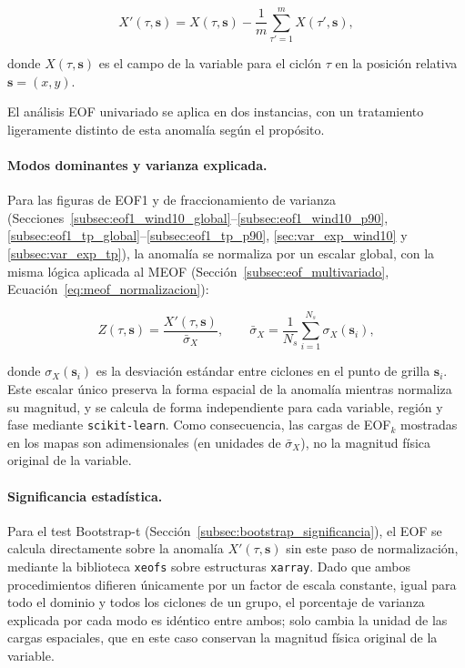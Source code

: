 \begin{equation}\label{eq:eof_anomalia}
    X'(\tau, \mathbf{s}) = X(\tau, \mathbf{s}) - \frac{1}{m}\sum_{\tau'=1}^{m}X(\tau', \mathbf{s}),
\end{equation}

donde $X(\tau, \mathbf{s})$ es el campo de la variable para el ciclón $\tau$ en la posición relativa $\mathbf{s} = (x,y)$.

El análisis EOF univariado se aplica en dos instancias, con un tratamiento ligeramente distinto de esta anomalía según el propósito.

\paragraph{Modos dominantes y varianza explicada.} Para las figuras de EOF1 y de fraccionamiento de varianza (Secciones~\ref{subsec:eof1_wind10_global}--\ref{subsec:eof1_wind10_p90}, \ref{subsec:eof1_tp_global}--\ref{subsec:eof1_tp_p90}, \ref{sec:var_exp_wind10} y \ref{subsec:var_exp_tp}), la anomalía se normaliza por un escalar global, con la misma lógica aplicada al MEOF (Sección~\ref{subsec:eof_multivariado}, Ecuación~\ref{eq:meof_normalizacion}):

\begin{equation}\label{eq:eof_normalizacion}
    Z(\tau, \mathbf{s}) = \frac{X'(\tau, \mathbf{s})}{\bar{\sigma}_X}, \qquad \bar{\sigma}_X = \frac{1}{N_s}\sum_{i=1}^{N_s} \sigma_X(\mathbf{s}_i),
\end{equation}

donde $\sigma_X(\mathbf{s}_i)$ es la desviación estándar entre ciclones en el punto de grilla $\mathbf{s}_i$. Este escalar único preserva la forma espacial de la anomalía mientras normaliza su magnitud, y se calcula de forma independiente para cada variable, región y fase mediante \texttt{scikit-learn}. Como consecuencia, las cargas de EOF$_k$ mostradas en los mapas son adimensionales (en unidades de $\bar\sigma_X$), no la magnitud física original de la variable.

\paragraph{Significancia estadística.} Para el test Bootstrap-t (Sección~\ref{subsec:bootstrap_significancia}), el EOF se calcula directamente sobre la anomalía $X'(\tau,\mathbf{s})$ sin este paso de normalización, mediante la biblioteca \texttt{xeofs} \citep{rieger2024xeofs} sobre estructuras \texttt{xarray}. Dado que ambos procedimientos difieren únicamente por un factor de escala constante, igual para todo el dominio y todos los ciclones de un grupo, el porcentaje de varianza explicada por cada modo es idéntico entre ambos; solo cambia la unidad de las cargas espaciales, que en este caso conservan la magnitud física original de la variable.


